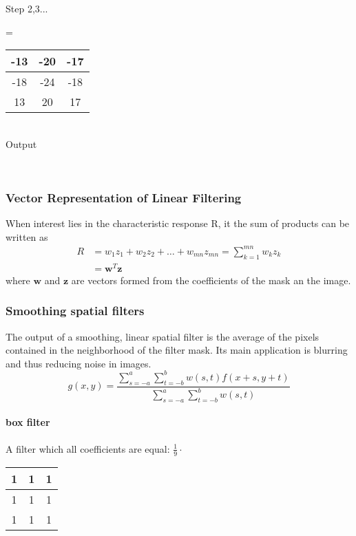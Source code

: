 	\begin{minipage}{2cm}
			Step 2,3...
	\end{minipage}
	\begin{minipage}{0.3cm}
		=
	\end{minipage}
	\begin{minipage}{2.3cm}
		\begin{tabular}{|c|c|c|} \hline
			-13 & -20 & -17 \\ \hline
	      	-18 & -24 & -18 \\ \hline
	      	13 & 20 & 17 \\ \hline
	      \end{tabular}
	      \\Output
	\end{minipage}
\\
	
\subsubsection{Vector Representation of Linear Filtering}
When interest lies in the characteristic response R, it the sum of products can be written as
\begin{align}
	R & = w_1z_1 + w_2z_2 + \dots + w_{mn}z_{mn} = \sum\limits_{k=1}^{mn}w_kz_k\\
	  & = \mathbf{w}^T\mathbf{z}
\end{align}
where $\mathbf{w}$ and $\mathbf{z}$ are vectors formed from the coefficients of the mask an the image.

\subsubsection{Smoothing spatial filters }
The output of a smoothing, linear spatial filter is the average of the pixels contained in the neighborhood of the filter mask.
Its main application is blurring and thus reducing noise in images.
\begin{equation}
g(x,y) = \frac{\sum\limits_{s=-a}^{a}\sum\limits_{t=-b}^{b}w(s,t) f(x+s, y+t)}{\sum\limits_{s=-a}^{a}\sum\limits_{t=-b}^{b}w(s,t)}
\end{equation}
\paragraph{box filter}
A filter which all coefficients are equal:
$ \frac{1}{9} \cdot$ \begin{tabular}{|c|c|c|} \hline 1 & 1 & 1 \\ \hline 1 & 1 & 1 \\ \hline 1 & 1 & 1  \\ \hline \end{tabular}
